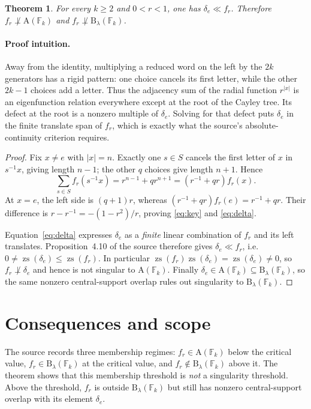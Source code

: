 \documentclass[11pt]{article}
\newtheorem*{theorem}{Theorem}
\newcommand{\F}{\mathbb F}
\newcommand{\A}{\mathrm A}
\newcommand{\Bl}{\mathrm B_{\lambda}}
\newcommand{\de}{\delta_e}
\newcommand{\zs}{\operatorname{zs}}
\begin{document}
\begin{theorem}
For every $k\geq2$ and $0<r<1$, one has $\de\ll f_r$.  Therefore
$f_r\not\perp\A(\F_k)$ and $f_r\not\perp\Bl(\F_k)$.
\end{theorem}

\paragraph{Proof intuition.}
Away from the identity, multiplying a reduced word on the left by the
$2k$ generators has a rigid pattern: one choice cancels its first letter,
while the other $2k-1$ choices add a letter.  Thus the adjacency sum of the
radial function $r^{|x|}$ is an eigenfunction relation everywhere except at
the root of the Cayley tree.  Its defect at the root is a nonzero multiple
of $\de$.  Solving for that defect puts $\de$ in the finite translate span
of $f_r$, which is exactly what the source's absolute-continuity criterion
requires.

\begin{proof}
Fix $x\neq e$ with $|x|=n$.  Exactly one $s\in S$ cancels the first letter
of $x$ in $s^{-1}x$, giving length $n-1$; the other $q$ choices give length
$n+1$.  Hence
\[
 \sum_{s\in S}f_r(s^{-1}x)=r^{n-1}+qr^{n+1}
 =(r^{-1}+qr)f_r(x).
\]
At $x=e$, the left side is $(q+1)r$, whereas
$(r^{-1}+qr)f_r(e)=r^{-1}+qr$.  Their difference is
$r-r^{-1}=-(1-r^2)/r$, proving \eqref{eq:key} and \eqref{eq:delta}.

Equation~\eqref{eq:delta} expresses $\de$ as a \emph{finite} linear
combination of $f_r$ and its left translates.  Proposition~4.10 of the
source therefore gives $\de\ll f_r$, i.e.
$0\neq\zs(\de)\leq\zs(f_r)$.  In particular
$\zs(f_r)\zs(\de)=\zs(\de)\neq0$, so $f_r\not\perp\de$ and hence is not
singular to $\A(\F_k)$.  Finally $\de\in\A(\F_k)\subseteq\Bl(\F_k)$, so the
same nonzero central-support overlap rules out singularity to
$\Bl(\F_k)$.
\end{proof}

\section*{Consequences and scope}
The source records three membership regimes: $f_r\in\A(\F_k)$ below the
critical value, $f_r\in\Bl(\F_k)$ at the critical value, and
$f_r\notin\Bl(\F_k)$ above it.  The theorem shows that this membership
threshold is \emph{not} a singularity threshold.  Above the threshold,
$f_r$ is outside $\Bl(\F_k)$ but still has nonzero central-support overlap
with its element $\de$.
\end{document}
